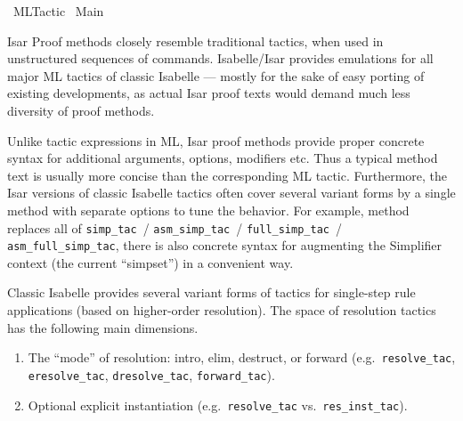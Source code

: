 %
\begin{isabellebody}%
\def\isabellecontext{ML{\isaliteral{5F}{\isacharunderscore}}Tactic}%
%
\isadelimtheory
%
\endisadelimtheory
%
\isatagtheory
{}\isamarkupfalse%
\ ML{}Tactic\isanewline
{}\ Main\isanewline
{}%
\endisatagtheory
{\isafoldtheory}%
%
\isadelimtheory
%
\endisadelimtheory
%
\isamarkuptrue%
%
\begin{isamarkuptext}%
Isar Proof methods closely resemble traditional tactics, when used
  in unstructured sequences of \hyperlink{command.apply}{\mbox{}} commands.
  Isabelle/Isar provides emulations for all major ML tactics of
  classic Isabelle --- mostly for the sake of easy porting of existing
  developments, as actual Isar proof texts would demand much less
  diversity of proof methods.

  Unlike tactic expressions in ML, Isar proof methods provide proper
  concrete syntax for additional arguments, options, modifiers etc.
  Thus a typical method text is usually more concise than the
  corresponding ML tactic.  Furthermore, the Isar versions of classic
  Isabelle tactics often cover several variant forms by a single
  method with separate options to tune the behavior.  For example,
  method \hyperlink{method.simp}{\mbox{}} replaces all of \verb|simp_tac|~/ \verb|asm_simp_tac|~/ \verb|full_simp_tac|~/ \verb|asm_full_simp_tac|, there
  is also concrete syntax for augmenting the Simplifier context (the
  current ``simpset'') in a convenient way.%
\end{isamarkuptext}%
\isamarkuptrue%
%
\isamarkuptrue%
%
\begin{isamarkuptext}%
Classic Isabelle provides several variant forms of tactics for
  single-step rule applications (based on higher-order resolution).
  The space of resolution tactics has the following main dimensions.

  \begin{enumerate}

  \item The ``mode'' of resolution: intro, elim, destruct, or forward
  (e.g.\ \verb|resolve_tac|, \verb|eresolve_tac|, \verb|dresolve_tac|,
  \verb|forward_tac|).

  \item Optional explicit instantiation (e.g.\ \verb|resolve_tac| vs.\
  \verb|res_inst_tac|).


\end{enumerate}
\end{isamarkuptext}
\end{isabellebody}
